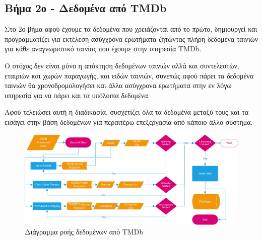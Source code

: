 \subsection{Βήμα 2ο - Δεδομένα από TMDb}
Στο 2ο βήμα αφού έχουμε τα δεδομένα που χρειάζονται από το πρώτο, δημιουργεί και προγραμματίζει για εκτέλεση ασύγχρονα ερωτήματα ζητώντας πλήρη δεδομένα ταινιών για κάθε αναγνωριστικό ταινίας που έχουμε στην υπηρεσία TMDb. 

Ο στόχος δεν είναι μόνο η απόκτηση δεδομένων ταινιών αλλά και συντελεστών, εταιριών και χωρών παραγωγής, και ειδών ταινιών, συνεπώς αφού πάρει τα δεδομένα ταινιών θα χρονοδρομολογήσει και άλλα ασύγχρονα ερωτήματα στην εν λόγω υπηρεσία για να πάρει και τα υπόλοιπα δεδομένα. 

Αφού τελειώσει αυτή η διαδικασία, συσχετίζει όλα τα δεδομένα μεταξύ τους και τα εισάγει στην βάση δεδομένων για περαιτέρω επεξεργασία από κάποιο άλλο σύστημα. 
\begin{figure}[h]
  \centering
  \includegraphics[width=150mm]{Chapters/5 - Architecture/Import/Images/tmdb_flowchart.png}
  \caption{Διάγραμμα ροής δεδομένων από TMDb}
  \label{flowchart:tmdbImport}
\end{figure}